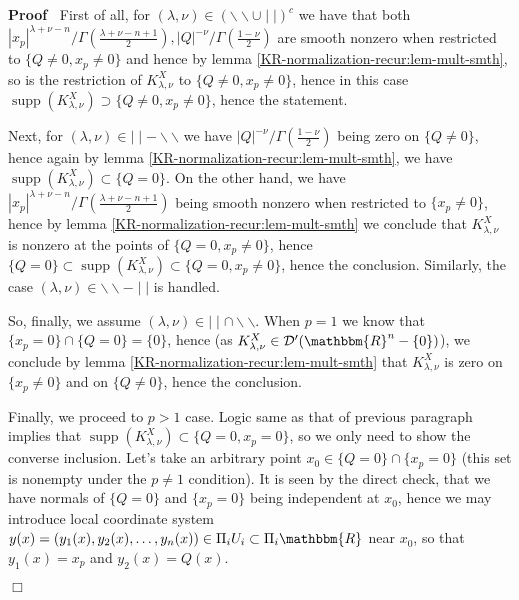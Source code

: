 \documentclass{article}
\newcommand{\tmop}[1]{\ensuremath{\operatorname{#1}}}
\renewenvironment{proof}{\noindent\textbf{Proof\ }}{\hspace*{\fill}$\Box$\medskip}
\theoremstyle{remark}
\begin{document}
\begin{proof}
  First of all, for $(\lambda, \nu) \in (\backslash\backslash \cup \mid
  \mid)^c$ we have that both $| x_p |^{\lambda + \nu - n} / \Gamma \left(
  \frac{\lambda + \nu - n + 1}{2} \right), | Q |^{- \nu} / \Gamma \left(
  \frac{1 - \nu}{2} \right)$ are smooth nonzero when restricted to $\{ Q \neq
  0, x_p \neq 0 \}$ and hence by lemma
  \ref{KR-normalization-recur:lem-mult-smth}, so is the restriction of
  $K_{\lambda, \nu}^X$ to $\{ Q \neq 0, x_p \neq 0 \}$, hence in this case
  $\tmop{supp} (K_{\lambda, \nu}^X) \supset \{ Q \neq 0, x_p \neq 0 \}$, hence
  the statement.
  
  Next, for $(\lambda, \nu) \in \mid \mid -\backslash\backslash$ we have $| Q
  |^{- \nu} / \Gamma \left( \frac{1 - \nu}{2} \right)$ being zero on $\{ Q
  \neq 0 \}$, hence again by lemma \ref{KR-normalization-recur:lem-mult-smth},
  we have $\tmop{supp} (K_{\lambda, \nu}^X) \subset \{ Q = 0 \}$. On the other
  hand, we have $| x_p |^{\lambda + \nu - n} / \Gamma \left( \frac{\lambda +
  \nu - n + 1}{2} \right)$ being smooth nonzero when restricted to $\{ x_p
  \neq 0 \}$, hence by lemma \ref{KR-normalization-recur:lem-mult-smth} we
  conclude that $K_{\lambda, \nu}^X$ is nonzero at the points of $\{ Q = 0,
  x_p \neq 0 \}$, hence $\{ Q = 0 \} \subset \tmop{supp} (K_{\lambda, \nu}^X)
  \subset \{ Q = 0, x_p \neq 0 \}$, hence the conclusion. Similarly, the case
  $(\lambda, \nu) \in \backslash\backslash - \mid \mid$ is handled.
  
  So, finally, we assume $(\lambda, \nu) \in \mid \mid \cap
  \backslash\backslash$. When $p = 1$ we know that $\{ x_p = 0 \} \cap \{ Q =
  0 \} = \{ 0 \}$, hence (as $K_{\lambda, \nu}^X \in \mathcal{D}'
  (\mathbbm{R}^n - \{ 0 \})$), we conclude by lemma
  \ref{KR-normalization-recur:lem-mult-smth} that $K_{\lambda, \nu}^X$ is zero
  on $\{ x_p \neq 0 \}$ and on $\{ Q \neq 0 \}$, hence the conclusion.
  
  Finally, we proceed to $p > 1$ case. Logic same as that of previous
  paragraph implies that $\tmop{supp} (K_{\lambda, \nu}^X) \subset \{ Q = 0,
  x_p = 0 \}$, so we only need to show the converse inclusion. Let's take an
  arbitrary point $x_0 \in \{ Q = 0 \} \cap \{ x_p = 0 \}$ (this set is
  nonempty under the $p \neq 1$ condition). It is seen by the direct check,
  that we have normals of $\{ Q = 0 \}$ and $\{ x_p = 0 \}$ being independent
  at $x_0$, hence we may introduce local coordinate system $y (x) = (y_1 (x),
  y_2 (x), \ldots, y_n (x)) \in \Pi_i U_i \subset \Pi_i \mathbbm{R}$ near
  $x_0$, so that $y_1 (x) = x_p$ and $y_2 (x) = Q (x)$.
  

\end{proof}
\end{document}
